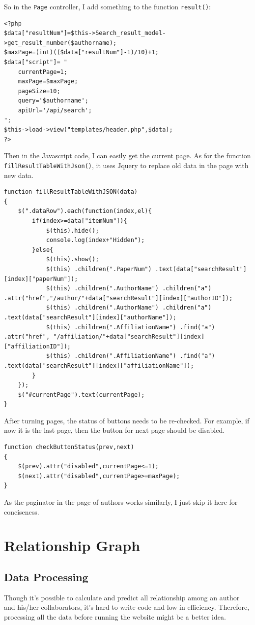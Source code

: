 \documentclass[a4paper]{article}
\begin{document}
So in the \texttt{Page} controller, I add something to the function \texttt{result()}:
\begin{verbatim}
<?php
$data["resultNum"]=$this->Search_result_model->get_result_number($authorname);
$maxPage=(int)(($data["resultNum"]-1)/10)+1;
$data["script"]= "
    currentPage=1;
    maxPage=$maxPage;
    pageSize=10;
    query='$authorname';
    apiUrl='/api/search';
";
$this->load->view("templates/header.php",$data);     
?>
\end{verbatim} 
Then in the Javascript code, I can easily get the current page.  As for the function \texttt{fillResultTableWithJson()}, it uses Jquery to replace old data in the page with new data.
\begin{verbatim}
function fillResultTableWithJSON(data)
{
    $(".dataRow").each(function(index,el){
        if(index>=data["itemNum"]){
            $(this).hide();
            console.log(index+"Hidden");
        }else{
            $(this).show();
            $(this) .children(".PaperNum") .text(data["searchResult"][index]["paperNum"]);
            $(this) .children(".AuthorName") .children("a") .attr("href","/author/"+data["searchResult"][index]["authorID"]);
            $(this) .children(".AuthorName") .children("a") .text(data["searchResult"][index]["authorName"]);
            $(this) .children(".AffiliationName") .find("a") .attr("href", "/affiliation/"+data["searchResult"][index]["affiliationID"]);
            $(this) .children(".AffiliationName") .find("a") .text(data["searchResult"][index]["affiliationName"]);
        }
    });
    $("#currentPage").text(currentPage);
}
\end{verbatim}
After turning pages, the status of buttons needs to be re-checked. For example, if now it is the last page, then the button for next page should be disabled. 
\begin{verbatim}
function checkButtonStatus(prev,next)
{
    $(prev).attr("disabled",currentPage<=1);
    $(next).attr("disabled",currentPage>=maxPage);
}
\end{verbatim}
As the paginator in the page of authors works similarly, I just skip it here for conciseness.
    \newpage
    \section{Relationship Graph}
        \subsection{Data Processing}
Though it's possible to calculate and predict all relationship among an author and his/her collaborators, it's hard to write code and low in efficiency. Therefore, processing all the data before running the website might be a better idea.
\end{document}
